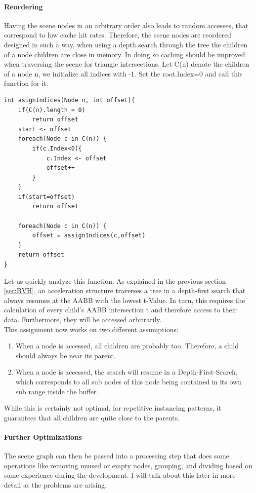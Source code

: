 \paragraph{Reordering}
\label{sec:Reorder}
Having the scene nodes in an arbitrary order also leads to random accesses,  that correspond to low cache hit rates. Therefore, the scene nodes are reordered designed in such a way, when using a depth search through the tree the children of a node children are close in memory. In doing so caching should be improved when traversing the scene for triangle intersections. Let C(n) denote the children of a node n, we initialize all indices with -1. Set the root.Index=0 and call this function for it.
\begin{lstlisting}
int asignIndices(Node n, int offset){
    if(C(n).length = 0)
        return offset
    start <- offset
    foreach(Node c in C(n)) {
        if(c.Index<0){
            c.Index <- offset
            offset++
        }
    }
    if(start=offset)
        return offset
    
    foreach(Node c in C(n)) {
        offset = assignIndices(c,offset)
    }
    return offset
}
\end{lstlisting}
Let us quickly analyze this function. As explained in the previous section \ref{sec:BVH}, an acceleration structure traverses a tree in a depth-first search that always resumes at the AABB with the lowest t-Value. In turn, this requires the calculation of every child's AABB intersection t and therefore access to their data. Furthermore, they will be accessed arbitrarily.\\
This assignment now works on two different assumptions:
\begin{enumerate}
    \item When a node is accessed, all children are probably too. Therefore, a child should always be near its parent.
    \item When a node is accessed, the search will resume in a Depth-First-Search, which corresponds to all sub nodes of this node being contained in its own sub range inside the buffer.
\end{enumerate}
While this is certainly not optimal, for repetitive instancing patterns, it guarantees that all children are quite close to the parents.
\paragraph{Further Optimizations}
The scene graph can then be passed into a processing step that does some operations like removing unused or empty nodes, grouping, and dividing based on some experience during the development. I will talk about this later in more detail as the problems are arising.
